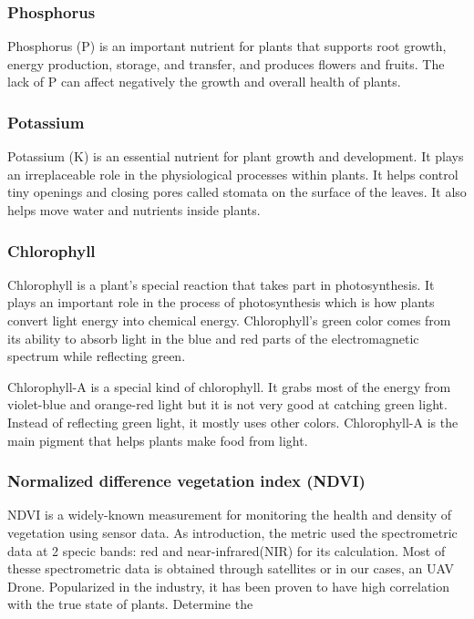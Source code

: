 \subsubsection{Phosphorus}
Phosphorus (P) is an important nutrient for plants that supports root growth, energy production, storage, and transfer, and produces flowers and fruits. The lack of P can affect negatively the growth and overall health of plants. 

\subsubsection{Potassium}

Potassium (K) is an essential nutrient for plant growth and development. It plays an irreplaceable role in the physiological processes within plants. It helps control tiny openings and closing pores called stomata on the surface of the leaves. It also helps move water and nutrients inside plants. 


\subsubsection{Chlorophyll}

Chlorophyll is a plant’s special reaction that takes part in photosynthesis. It plays an important role in the process of photosynthesis which is how plants convert light energy into chemical energy. Chlorophyll’s green color comes from its ability to absorb light in the blue and red parts of the electromagnetic spectrum while reflecting green\cite*{chlorophyll}.

Chlorophyll-A is a special kind of chlorophyll. It grabs most of the energy from violet-blue and orange-red light but it is not very good at catching green light. Instead of reflecting green light, it mostly uses other colors. Chlorophyll-A is the main pigment that helps plants make food from light. 

\subsubsection{Normalized difference vegetation index (NDVI)}
NDVI is a widely-known measurement for monitoring the health and density of vegetation using sensor data. As introduction, the metric used the spectrometric data at 2 specic bands: red and near-infrared(NIR) for its calculation. Most of thesse spectrometric data is obtained through satellites or in our cases, an UAV Drone. Popularized in the industry, it has been proven to have high correlation with the true state of plants. Determine the 

